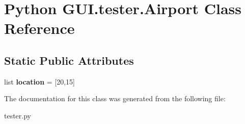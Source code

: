 \hypertarget{class_python_01_g_u_i_1_1tester_1_1_airport}{}\section{Python G\+U\+I.\+tester.\+Airport Class Reference}
\label{class_python_01_g_u_i_1_1tester_1_1_airport}
\subsection*{Static Public Attributes}
\begin{DoxyCompactItemize}
\item 
\mbox{\label{class_python_01_g_u_i_1_1tester_1_1_airport_ad68d38cd591a911d93d16030c6362ffa}} 
list {\bfseries location} = \mbox{[}20,15\mbox{]}
\end{DoxyCompactItemize}


The documentation for this class was generated from the following file\+:\begin{DoxyCompactItemize}
\item 
tester.\+py\end{DoxyCompactItemize}
